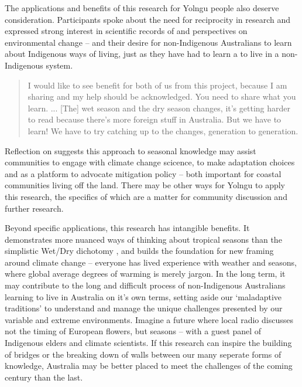 The applications and benefits of this research for Yolngu people also deserve
consideration.  Participants spoke about the need for reciprocity in research
and expressed strong interest in scientific records of and perspectives on
environmental change -- and their desire for non-Indigenous Australians to
learn about Indigenous ways of living, just as they have had to learn a to
live in a non-Indigenous system.
\begin{quote}
    I would like to see benefit for both of us from this project, because I am
    sharing and my help should be acknowledged.  You need to share what you learn. ...
    [The] wet season and the dry season changes, it's getting harder to read
    because there's more foreign stuff in Australia.  But we have to learn!
    We have to try catching up to the changes, generation to generation.
\end{quote}
Reflection on \citet{petheram2010} suggests this approach to seasonal knowledge
may assist communities to engage with climate change scicence, to make
adaptation choices and as a platform to advocate mitigation policy -- both
important for coastal communities living off the land.  There may be other
ways for Yolngu to apply this research, the specifics of which are a matter for
community discussion and further research.


Beyond specific applications, this research has intangible benefits.  It
demonstrates more nuanced ways of thinking about tropical seasons than the
simplistic Wet/Dry dichotomy \citep{willmett2009}, and builds the foundation
for new framing around climate change -- everyone has lived experience with
weather and seasons, where global average degrees of warming is merely jargon.
%
In the long term, it may contribute to the long and difficult process of
non-Indigenous Australians learning to live in Australia on it's own terms,
setting aside our `maladaptive traditions' \citep{flannery1994} to understand
and manage the unique challenges presented by our variable and extreme
environments.  Imagine a future where local radio discusses not the timing of
European flowers, but seasons -- with a guest panel of Indigenous elders and
climate scientists.
%
If this research can inspire the building of bridges or the breaking down of walls
between our many seperate forms of knowledge, Australia may be better placed
to meet the challenges of the coming century than the last.


